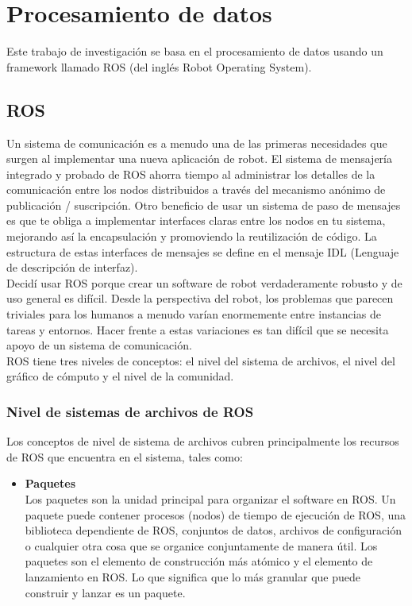 

\section{Procesamiento de datos}
Este trabajo de investigación se basa en el procesamiento de datos usando un framework
llamado ROS (del inglés Robot Operating System).
\subsection{ROS}
Un sistema de comunicación es a menudo una de las primeras necesidades que surgen al
implementar una nueva aplicación de robot. El sistema de mensajería integrado y
probado de ROS ahorra tiempo al administrar los detalles de la comunicación entre
los nodos distribuidos a través del mecanismo anónimo de publicación / suscripción.
Otro beneficio de usar un sistema de paso de mensajes es que te obliga a implementar
interfaces claras entre los nodos en tu sistema, mejorando así la encapsulación y
promoviendo la reutilización de código. La estructura de estas interfaces de mensajes
se define en el mensaje IDL (Lenguaje de descripción de interfaz).\\
Decidí usar ROS porque crear un software de robot verdaderamente robusto y de uso
general es difícil. Desde la perspectiva del robot, los problemas que parecen triviales
para los humanos a menudo varían enormemente entre instancias de tareas y entornos.
Hacer frente a estas variaciones es tan difícil que se necesita apoyo de un sistema
de comunicación.\\
ROS tiene tres niveles de conceptos: el nivel del sistema de archivos, el nivel del gráfico
de cómputo y el nivel de la comunidad. ~\cite{ROS}
\subsubsection{Nivel de sistemas de archivos de ROS}
Los conceptos de nivel de sistema de archivos cubren principalmente los recursos de ROS que
encuentra en el sistema, tales como:
\begin{itemize}
    \item \textbf{Paquetes}\\
    Los paquetes son la unidad principal para organizar el software
    en ROS. Un paquete puede contener procesos (nodos) de tiempo de ejecución de ROS,
    una biblioteca dependiente de ROS, conjuntos de datos, archivos de configuración o
    cualquier otra cosa que se organice conjuntamente de manera útil. Los paquetes son
    el elemento de construcción más atómico y el elemento de lanzamiento en ROS. Lo
    que significa que lo más granular que puede construir y lanzar es un paquete.
\end{itemize}
